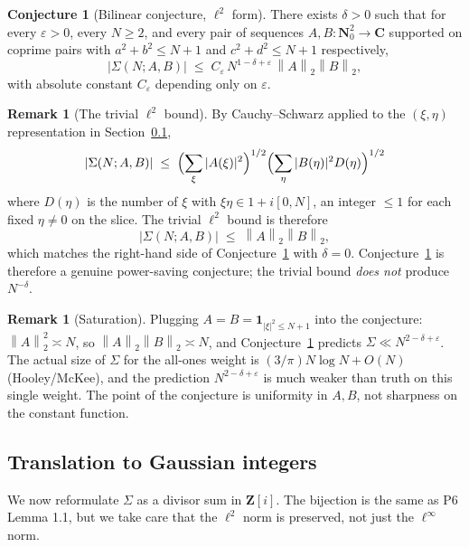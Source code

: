 \documentclass[11pt]{article}
\theoremstyle{definition}
\newtheorem{conjecture}[theorem]{Conjecture}
\newtheorem{remark}[theorem]{Remark}
\newcommand{\Nz}{\mathbf{N}_0}
\newcommand{\Z}{\mathbf{Z}}
\newcommand{\C}{\mathbf{C}}
\newcommand{\Zi}{\Z[i]}
\newcommand{\norm}[1]{\left\lVert #1\right\rVert}
\begin{document}
\begin{conjecture}[Bilinear conjecture, $\ell^2$ form]\label{conj:bilin-l2}
There exists $\delta>0$ such that for every $\varepsilon>0$, every $N\ge 2$, and every pair of sequences $A,B:\Nz^2\to\C$ supported on coprime pairs with $a^2+b^2\le N+1$ and $c^2+d^2\le N+1$ respectively,
\[
\bigl|\Sigma(N;A,B)\bigr|\;\le\; C_\varepsilon\,N^{1-\delta+\varepsilon}\,\norm{A}_2\norm{B}_2,
\]
with absolute constant $C_\varepsilon$ depending only on $\varepsilon$.
\end{conjecture}

\begin{remark}[The trivial $\ell^2$ bound]\label{rmk:l2-trivial}
By Cauchy--Schwarz applied to the $(\xi,\eta)$ representation in Section~\ref{ssec:setup-bijection},
\[
|\Sigma(N;A,B)|\;\le\;\Bigl(\sum_\xi|A(\xi)|^2\Bigr)^{1/2}\Bigl(\sum_\eta|B(\eta)|^2 D(\eta)\Bigr)^{1/2}
\]
where $D(\eta)$ is the number of $\xi$ with $\xi\eta\in 1+i[0,N]$, an integer $\le 1$ for each fixed $\eta\ne 0$ on the slice. The trivial $\ell^2$ bound is therefore
\[
|\Sigma(N;A,B)|\;\le\;\norm{A}_2\norm{B}_2,
\]
which matches the right-hand side of Conjecture~\ref{conj:bilin-l2} with $\delta=0$. Conjecture~\ref{conj:bilin-l2} is therefore a genuine power-saving conjecture; the trivial bound \emph{does not} produce $N^{-\delta}$.
\end{remark}

\begin{remark}[Saturation]\label{rmk:saturation}
Plugging $A=B=\mathbf{1}_{|\xi|^2\le N+1}$ into the conjecture: $\norm{A}_2^2\asymp N$, so $\norm{A}_2\norm{B}_2\asymp N$, and Conjecture~\ref{conj:bilin-l2} predicts $\Sigma\ll N^{2-\delta+\varepsilon}$. The actual size of $\Sigma$ for the all-ones weight is $(3/\pi)N\log N+O(N)$ (Hooley/McKee), and the prediction $N^{2-\delta+\varepsilon}$ is much weaker than truth on this single weight. The point of the conjecture is uniformity in $A,B$, not sharpness on the constant function.
\end{remark}

\subsection{Translation to Gaussian integers}\label{ssec:setup-bijection}

We now reformulate $\Sigma$ as a divisor sum in $\Zi$. The bijection is the same as P6 Lemma 1.1, but we take care that the $\ell^2$ norm is preserved, not just the $\ell^\infty$ norm.
\end{document}
